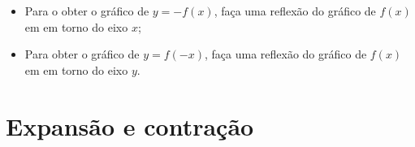 
  

        



        


\begin{obs}
\begin{itemize}
    \item Para o obter o gráfico de $y=-f(x)$, faça uma reflexão do gráfico de $f(x)$ em em torno do eixo $x$;
    \item Para obter o gráfico de $y=f(-x)$, faça uma reflexão do gráfico de $f(x)$ em em torno do eixo $y$.
\end{itemize}
\end{obs}


\section{Expansão e contração}

